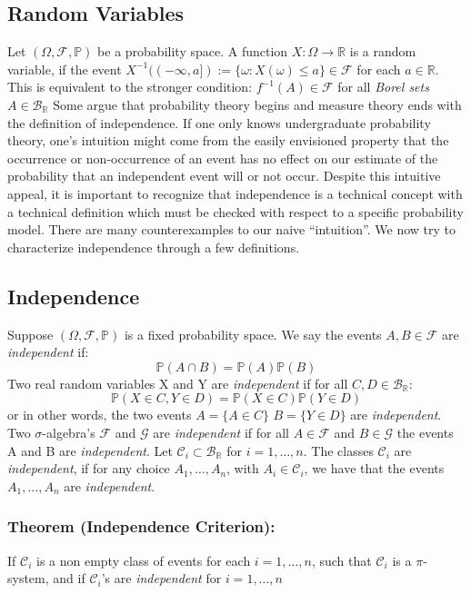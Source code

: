 \documentclass{article}
\begin{document}
\subsection{Random Variables}
Let $(\Omega,\mathcal{F}, \mathbb{P})$ be a probability space. A function $X:\Omega\to\mathbb{R}$ is a random variable, if the event $X^{-1}((-\infty,a]):=\{\omega:X(\omega)\leq a\}\in\mathcal{F}$ for each $a \in \mathbb{R}$. This is equivalent to the stronger condition: $f^{-1}(A)\in\mathcal{F}$ for all \emph{Borel sets} $A\in\mathcal{B}_\mathbb{R}$  \newline \newline
Some argue that probability theory begins and measure theory ends with the definition of independence. If one only knows undergraduate probability theory, one's intuition might come from the easily envisioned property that the occurrence or non-occurrence of an event has no effect on our estimate of the probability that an independent event will or not occur.
Despite this intuitive appeal, it is important to recognize that independence is a technical concept with a technical definition which must be checked with respect to a specific probability model. There are many counterexamples to our naive ``intuition''. We now try to characterize independence through a few definitions.
\subsection{Independence}
Suppose $(\Omega, \mathcal{F},\mathbb{P})$ is a fixed probability space. We say the events $A, B \in \mathcal{F}$ are \emph{independent} if: \[
\mathbb{P}(A \cap B) = \mathbb{P}(A)\mathbb{P}(B)
\]
Two real random variables X and Y are \emph{independent} if for all $C,D\in\mathcal{B}_{\mathbb{R}}:$
\[
\mathbb{P}(X\in C,Y\in D)=\mathbb{P}(X\in C)\mathbb{P}(Y\in D)
\]
or in other words, the two events $A=\{A\in C\}$ $B=\{Y\in D\}$ are \emph{independent}.\newline \newline
Two $\sigma$-algebra's $\mathcal{F}$ and $\mathcal{G}$ are \emph{independent} if for all $A \in \mathcal{F}$ and $B \in \mathcal{G}$ the events A and B are \emph{independent}.\newline \newline
Let $\mathcal{C}_i\subset \mathcal{B}_{\mathbb{R}}$ for $i=1,\ldots,n$. The classes $\mathcal{C}_i$ are \emph{independent}, if for any choice $A_1,\ldots,A_n$, with $A_i\in\mathcal{C}_i$, we have that the events $A_1,\ldots,A_n$ are \emph{independent}.
\subsubsection{Theorem (Independence Criterion):}
If $\mathcal{C}_i$ is a non empty class of events for each $i=1,\ldots,n$, such that $\mathcal{C}_i$ is a $\pi$-system, and if $\mathcal{C}_i$'s are \emph{independent} for $i=1,\ldots,n$ 
\end{document}
